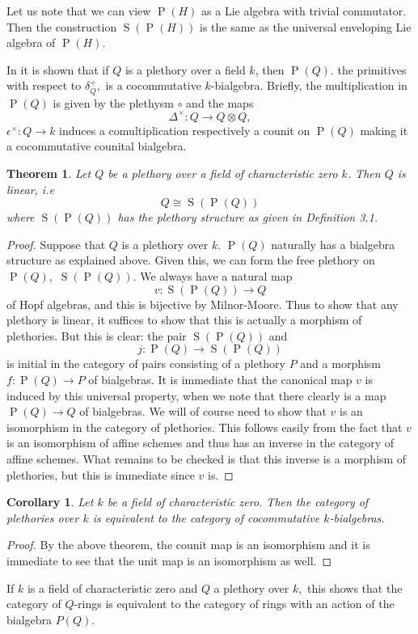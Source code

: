 \documentclass[a4paper, 12pt]{amsart}
\DeclareMathOperator{\Prim}{P}
\DeclareMathOperator{\Sym}{S}
\numberwithin{equation}{section}
\newtheorem{corollary} [equation]{Corollary}
\newtheorem{theorem}{Theorem}[section]
\theoremstyle{definition}
\begin{document}
\begin{remark}
Let us note that we can view $\Prim(H)$ as a Lie algebra with trivial commutator. Then the construction $\Sym(\Prim(H))$ is the same as the universal enveloping Lie algebra of $\Prim(H).$ 
\end{remark}
\noindent In \cite{BW} it is shown that if $Q$ is a plethory over a field $k$, then $\Prim(Q).$ the primitives with respect to $\delta^+_Q,$ is a cocommutative $k$-bialgebra. Briefly, the multiplication in $\Prim(Q)$ is given by the plethysm $\circ$ and the maps $$\Delta^\times:Q \rightarrow Q \otimes Q,$$  $\epsilon^\times:Q \rightarrow k$ induces a comultiplication respectively a counit on $\Prim(Q)$ making it a cocommutative counital bialgebra.   
\begin{theorem}
Let $Q$ be a plethory over a field of characteristic zero $k$. Then $Q$ is linear, i.e $$Q \cong \Sym(\Prim(Q))$$ where $\Sym(\Prim(Q))$ has the plethory structure as given in Definition 3.1. 
\end{theorem}

\begin{proof}
Suppose that $Q$  is a plethory over $k$. $\Prim(Q)$  naturally has a bialgebra structure as explained above. Given this, we can form the free plethory on $\Prim(Q),$ $\Sym(\Prim(Q)).$ We always have a natural map $$v:\Sym(\Prim(Q)) \rightarrow Q$$ of Hopf algebras, and this is bijective by Milnor-Moore. Thus to show that any plethory is linear, it suffices to show that this is actually a morphism of plethories. But this is clear: the pair $\Sym(\Prim(Q))$ and $$j:\Prim(Q) \rightarrow \Sym(\Prim(Q))$$ is initial in the category of pairs consisting of a plethory $P$ and a morphism $f:\Prim(Q) \rightarrow P$ of bialgebras. It is immediate that the canonical map  $v$ is induced by this universal property, when we note that there clearly is a map $\Prim(Q) \rightarrow Q$ of bialgebras. We will of course need to show that $v$ is an isomorphism in the category of plethories. This follows easily from the fact that $v$ is an isomorphism of affine schemes and thus has an inverse in the category of affine schemes. What remains to be checked is that this inverse is a morphism of plethories, but this is immediate since $v$ is.
\end{proof}
\begin{corollary}
Let $k$ be a field of characteristic zero. Then the category of plethories over $k$ is equivalent to the category of cocommutative $k$-bialgebras.
\end{corollary}
\begin{proof}
By the above theorem, the counit map is an isomorphism and it is immediate to see that the unit map is an isomorphism as well. 
\end{proof}
\begin{remark}
If $k$ is a field of characteristic zero and $Q$ a plethory over $k,$ this shows that the category of $Q$-rings is equivalent to the category of rings with an action of the bialgebra $P(Q).$ 
\end{remark}
\end{document}
